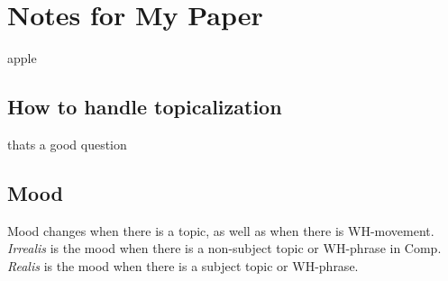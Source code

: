 \documentclass[12pt]{article}
\begin{document}
\section*{Notes for My Paper}

apple

\subsection*{How to handle topicalization}

thats a good question

\subsection*{Mood}

Mood changes when there is a topic, as well as when
there is WH-movement.  \emph{Irrealis} is the mood when
there is a non-subject topic or WH-phrase in Comp.
\emph{Realis} is the mood when there is a subject topic
or WH-phrase.
\end{document}
